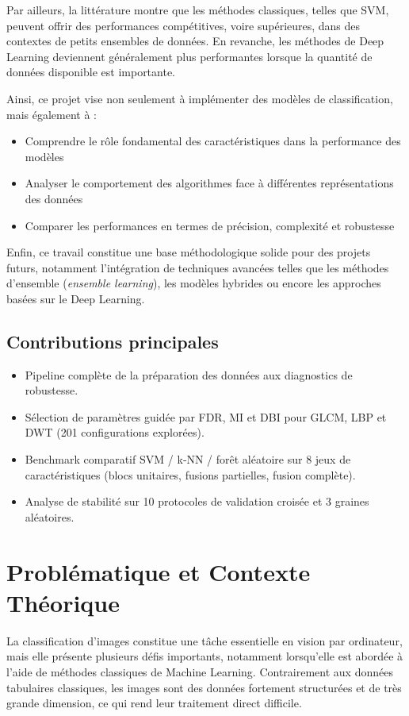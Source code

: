 \documentclass[12pt,a4paper]{article}
\begin{document}
    Par ailleurs, la littérature montre que les méthodes classiques, telles que SVM, peuvent offrir des performances compétitives, voire supérieures, dans des contextes de petits ensembles de données.
    En revanche, les méthodes de Deep Learning deviennent généralement plus performantes lorsque la quantité de données disponible est importante.

    Ainsi, ce projet vise non seulement à implémenter des modèles de classification, mais également à :
    \begin{itemize}
        \item Comprendre le rôle fondamental des caractéristiques dans la performance des modèles
        \item Analyser le comportement des algorithmes face à différentes représentations des données
        \item Comparer les performances en termes de précision, complexité et robustesse
    \end{itemize}

    Enfin, ce travail constitue une base méthodologique solide pour des projets futurs, notamment l’intégration de techniques avancées telles que les méthodes d’ensemble (\textit{ensemble learning}), les modèles hybrides ou encore les approches basées sur le Deep Learning.

    \subsection{Contributions principales}
    \begin{itemize}
    \item Pipeline complète de la préparation des données aux diagnostics de robustesse.
    \item Sélection de paramètres guidée par FDR, MI et DBI pour GLCM, LBP et DWT (201 configurations explorées).
    \item Benchmark comparatif SVM / k‑NN / forêt aléatoire sur 8 jeux de caractéristiques (blocs unitaires, fusions partielles, fusion complète).
    \item Analyse de stabilité sur 10 protocoles de validation croisée et 3 graines aléatoires.
    \end{itemize}

    \section{Problématique et Contexte Théorique}

    La classification d’images constitue une tâche essentielle en vision par ordinateur, mais elle présente plusieurs défis importants, notamment lorsqu’elle est abordée à l’aide de méthodes classiques de Machine Learning.
    Contrairement aux données tabulaires classiques, les images sont des données fortement structurées et de très grande dimension, ce qui rend leur traitement direct difficile.
\end{document}
